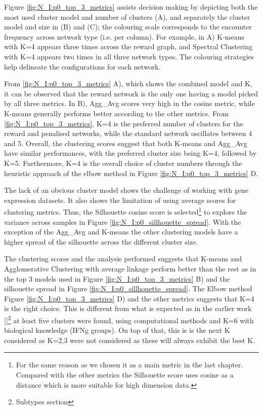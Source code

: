 {%
Figure \ref{fig:N_I:p0_top_3_metrics} assists decision making by depicting both the most used cluster model and number of clusters (A), and separately the cluster model and size in (B) and (C); the colouring scale corresponds to the encounter frequency across network type (i.e. per column). For example, in A) K-means with K=4 appears three times across the reward graph, and Spectral Clustering with K=4 appears two times in all three network types. The colouring strategies help delineate the configurations for each network.

From \cref{fig:N_I:p0_top_3_metrics} A), which shows the combined model and K, it can be observed that the reward network is the only one having a model picked by all three metrics. In B), Agg\_Avg scores very high in the cosine metric, while K-means generally performs better according to the other metrics. From \cref{fig:N_I:p0_top_3_metrics}, K=4 is the preferred number of clusters for the reward and penalised networks, while the standard network oscillates between 4 and 5. Overall, the clustering scores suggest that both K-means and Agg\_Avg have similar performances, with the preferred cluster size being K=4, followed by K=5. Furthermore, K=4 is the overall choice of cluster numbers through the heuristic approach of the elbow method in Figure \ref{fig:N_I:p0_top_3_metrics} D.


The lack of an obvious cluster model shows the challenge of working with gene expression datasets. It also shows the limitation of using average scores for clustering metrics. Thus, the Silhouette cosine score is selected\footnote{For the same reason as we chosen it as a main metric in the last chapter. Compared with the other metrics the Silhouette score uses cosine as a distance which is more suitable for high dimension data.} to explore the variance across samples in Figure \ref{fig:N_I:p0_sillhouette_spread}. With the exception of the Agg\_Avg and K-means the other clustering models have a higher spread of the silhouette across the different cluster size.

The clustering scores and the analysis performed suggests that K-means and Agglomerative Clustering with average linkage perform better than the rest as in the top 3 models used in Figure \ref{fig:N_I:p0_top_3_metrics} B) and the silhouette spread in Figure \ref{fig:N_I:p0_sillhouette_spread}. The Elbow method Figure \ref{fig:N_I:p0_top_3_metrics} D) and the other metrics suggests that K=4 is the right choice. This is different from what is expected as in the earlier work \ref{}\footnote{Subtypes section} at least five clusters were found, using computational methods and K=6 with biological knowledge (IFNg groups). On top of that, this is is the next K considered as K=2,3 were not considered as these will always exhibit the best K.

}
